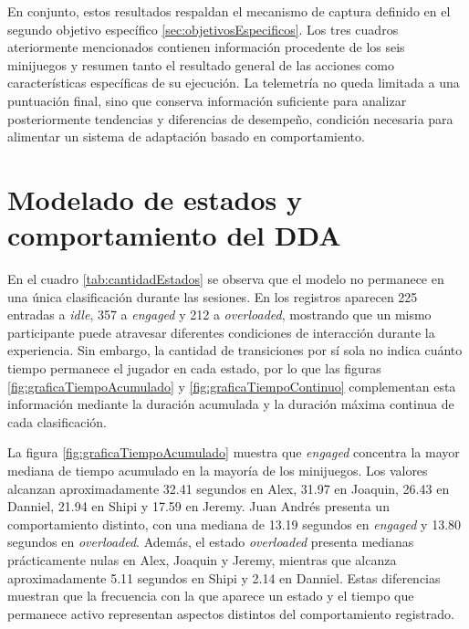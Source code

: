 En conjunto, estos resultados respaldan el mecanismo de captura definido
en el segundo objetivo específico \ref{sec:objetivosEspecificos}. Los tres
cuadros ateriormente mencionados contienen información procedente de los seis
minijuegos y resumen tanto el resultado general de las acciones como 
características específicas de su ejecución. La telemetría no queda 
limitada a una puntuación final, sino que conserva información 
suficiente para analizar posteriormente tendencias y diferencias de 
desempeño, condición necesaria para alimentar un sistema de adaptación 
basado en comportamiento.

\section{Modelado de estados y comportamiento del DDA}
En el cuadro \ref{tab:cantidadEstados} se observa que el modelo no 
permanece en una única clasificación durante las sesiones. En los 
registros aparecen 225 entradas a \textit{idle}, 357 a \textit{engaged} y 
212 a \textit{overloaded}, mostrando que un mismo participante puede 
atravesar diferentes condiciones de interacción durante la experiencia. 
Sin embargo, la cantidad de transiciones por sí sola no indica cuánto 
tiempo permanece el jugador en cada estado, por lo que las figuras 
\ref{fig:graficaTiempoAcumulado} y \ref{fig:graficaTiempoContinuo} 
complementan esta información mediante la duración acumulada y la 
duración máxima continua de cada clasificación.

La figura \ref{fig:graficaTiempoAcumulado} muestra que \textit{engaged} 
concentra la mayor mediana de tiempo acumulado en la mayoría de los 
minijuegos. Los valores alcanzan aproximadamente 32.41 segundos en Alex, 
31.97 en Joaquin, 26.43 en Danniel, 21.94 en Shipi y 17.59 en Jeremy. 
Juan Andrés presenta un comportamiento distinto, con una mediana de 13.19 
segundos en \textit{engaged} y 13.80 segundos en \textit{overloaded}. 
Además, el estado \textit{overloaded} presenta medianas prácticamente 
nulas en Alex, Joaquin y Jeremy, mientras que alcanza aproximadamente 
5.11 segundos en Shipi y 2.14 en Danniel. Estas diferencias muestran que 
la frecuencia con la que aparece un estado y el tiempo que permanece 
activo representan aspectos distintos del comportamiento registrado.

